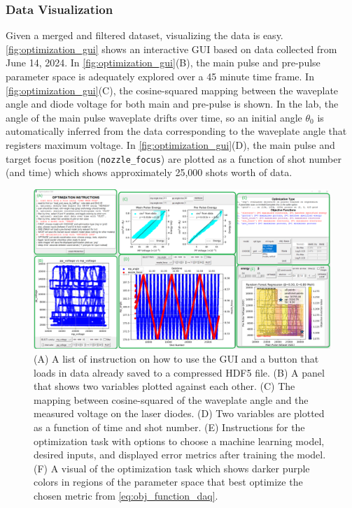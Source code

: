 \subsubsection{Data Visualization}
Given a merged and filtered dataset, visualizing the data is easy. \autoref{fig:optimization_gui} shows an interactive GUI based on data collected from June 14, 2024. In \autoref{fig:optimization_gui}(B), the main pulse and pre-pulse parameter space is adequately explored over a 45 minute time frame. In \autoref{fig:optimization_gui}(C), the cosine-squared mapping between the waveplate angle and diode voltage for both main and pre-pulse is shown. In the lab, the angle of the main pulse waveplate drifts over time, so an initial angle $\theta_0$ is automatically inferred from the data corresponding to the waveplate angle that registers maximum voltage. In \autoref{fig:optimization_gui}(D), the main pulse and target focus position (\texttt{nozzle\_focus}) are plotted as a function of shot number (and time) which shows approximately 25,000 shots worth of data.

\begin{figure}
	\centering 
	\includegraphics[width=\linewidth]{planning/images/daq/optimization_gui.png}
	\caption{(A) A list of instruction on how to use the GUI and a button that loads in data already saved to a compressed HDF5 file. (B) A panel that shows two variables plotted against each other. (C) The mapping between cosine-squared of the waveplate angle and the measured voltage on the laser diodes. (D) Two variables are plotted as a function of time and shot number. (E) Instructions for the optimization task with options to choose a machine learning model, desired inputs, and displayed error metrics after training the model. (F) A visual of the optimization task which shows darker purple colors in regions of the parameter space that best optimize the chosen metric from \autoref{eq:obj_function_daq}.}
	\label{fig:optimization_gui}
\end{figure}

